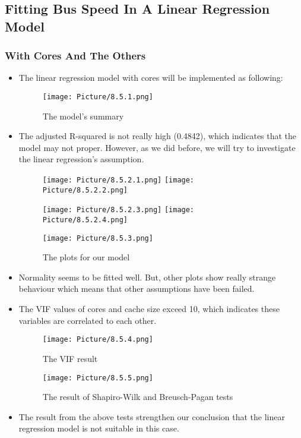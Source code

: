 \documentclass[a4paper]{article}
\begin{document}
\subsection{Fitting Bus Speed In A Linear Regression Model}
\subsubsection{With Cores And The Others}
\begin{itemize}
    \item[]The linear regression model with cores will be implemented as following:

    \begin{figure}[H]
        \centering
        \texttt{[image: Picture/8.5.1.png]}
        \caption{The model's summary}
    \end{figure}

    \item[] The adjusted R-squared is not really high (0.4842), which indicates that the model may not proper. However, as we did before, we will try to investigate the linear regression's assumption.
    
    \begin{figure}[H]
        \centering
        \texttt{[image: Picture/8.5.2.1.png]}
        \texttt{[image: Picture/8.5.2.2.png]}
    \end{figure}

    \begin{figure}[H]
        \centering
        \texttt{[image: Picture/8.5.2.3.png]}
        \texttt{[image: Picture/8.5.2.4.png]}
    \end{figure}

    \begin{figure}[H]
        \centering
        \texttt{[image: Picture/8.5.3.png]}
        \caption{The plots for our model}
    \end{figure}

    \item[] Normality seems to be fitted well. But, other plots show really strange behaviour which means that other assumptions have been failed.

    \item[] The VIF values of cores and cache size exceed 10, which indicates these variables are correlated to each other.

    \begin{figure}[H]
        \centering
        \texttt{[image: Picture/8.5.4.png]}
        \caption{The VIF result}
    \end{figure}

    \begin{figure}[H]
        \centering
        \texttt{[image: Picture/8.5.5.png]}
        \caption{The result of Shapiro-Wilk and Breusch-Pagan tests}
    \end{figure}

    \item[] The result from the above tests strengthen our conclusion that the linear regression model is not suitable in this case.
\end{itemize}
\end{document}
